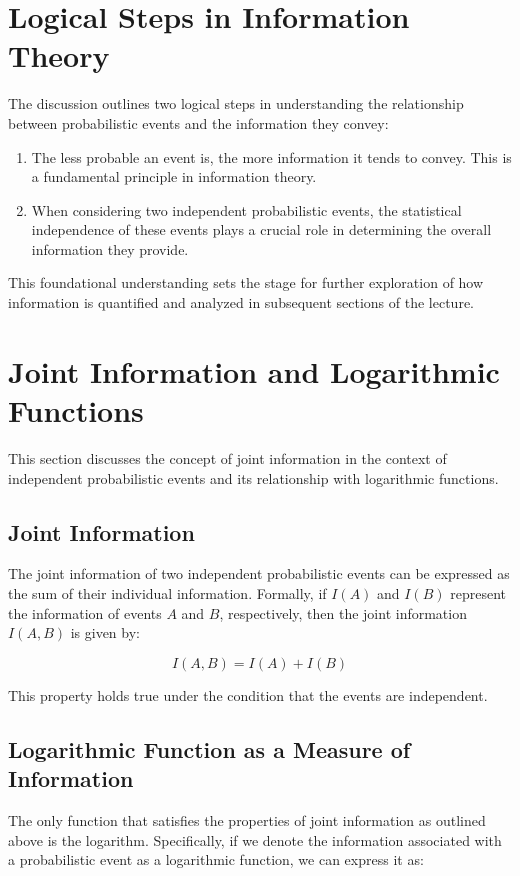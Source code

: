 \documentclass[12pt,a4paper]{article}
\begin{document}
\section{Logical Steps in Information Theory}
The discussion outlines two logical steps in understanding the relationship between probabilistic events and the information they convey:

\begin{enumerate}
    \item The less probable an event is, the more information it tends to convey. This is a fundamental principle in information theory.
    \item When considering two independent probabilistic events, the statistical independence of these events plays a crucial role in determining the overall information they provide.
\end{enumerate}

This foundational understanding sets the stage for further exploration of how information is quantified and analyzed in subsequent sections of the lecture.

\section{Joint Information and Logarithmic Functions}
This section discusses the concept of joint information in the context of independent probabilistic events and its relationship with logarithmic functions.

\subsection{Joint Information}
The joint information of two independent probabilistic events can be expressed as the sum of their individual information. Formally, if \( I(A) \) and \( I(B) \) represent the information of events \( A \) and \( B \), respectively, then the joint information \( I(A, B) \) is given by:

\begin{equation}
I(A, B) = I(A) + I(B)
\end{equation}

This property holds true under the condition that the events are independent.

\subsection{Logarithmic Function as a Measure of Information}
The only function that satisfies the properties of joint information as outlined above is the logarithm. Specifically, if we denote the information associated with a probabilistic event as a logarithmic function, we can express it as:
\end{document}
